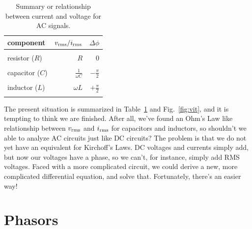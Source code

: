 \documentclass[12pt,oneside]{book}
\begin{document}
\begin{table}
\caption{Summary or relationship between current and voltage for AC signals.}
\label{tbl:rmsimp}
\begin{center}
\begin{tabular}{lrr}
component & $v_{\rm rms} / i_{\rm rms} $ & $\Delta \phi$ \\
\hline
\\
resistor ($R$) & $R$ & $0$ \\
\\
capacitor ($C$) & $\displaystyle \frac{1}{\omega C}$ & $\displaystyle -\frac{\pi}{2}$ \\
\\
inductor ($L$) & $\omega L$ & $\displaystyle +\frac{\pi}{2}$ \\
\\
\end{tabular}
\end{center}
\end{table}

The present situation is summarized in Table~\ref{tbl:rmsimp} and Fig.~\ref{fig:vit}, and it is tempting to think we are finished.  After all, we've found an Ohm's Law like relationship between $v_{\rm rms}$ and $i_{\rm rms}$ for capacitors and inductors, so shouldn't we able to analyze AC circuits just like DC circuits?  The problem is that we do not yet have an equivalent for Kirchoff's Laws.  DC voltages and currents simply add, but now our voltages have a phase, so we can't, for instance, simply add RMS voltages.  Faced with a more complicated circuit, we could derive a new, more complicated differential equation, and solve that.  Fortunately, there's an easier way!

\section{Phasors}
\end{document}

